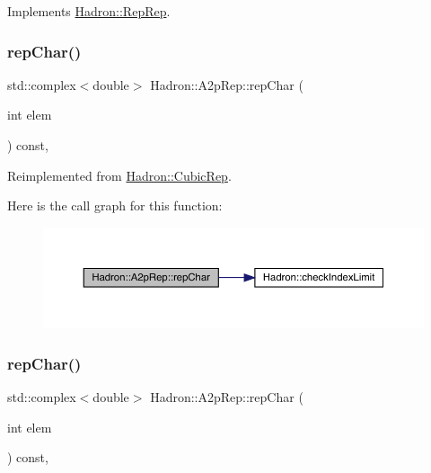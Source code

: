 Implements \mbox{\hyperlink{structHadron_1_1RepRep_ab3213025f6de249f7095892109575fde}{Hadron\+::\+Rep\+Rep}}.

\mbox{\label{structHadron_1_1A2pRep_a7e7d7668295318bf08c6ab79ce2208e6}} 
\subsubsection{\texorpdfstring{repChar()}{repChar()}\hspace{0.1cm}{\footnotesize\ttfamily [1/3]}}
{\footnotesize\ttfamily std\+::complex$<$double$>$ Hadron\+::\+A2p\+Rep\+::rep\+Char (\begin{DoxyParamCaption}\item[{int}]{elem }\end{DoxyParamCaption}) const\hspace{0.3cm}{\ttfamily [inline]}, {\ttfamily [virtual]}}



Reimplemented from \mbox{\hyperlink{structHadron_1_1CubicRep_af45227106e8e715e84b0af69cd3b36f8}{Hadron\+::\+Cubic\+Rep}}.

Here is the call graph for this function\+:
\nopagebreak
\begin{figure}[H]
\begin{center}
\leavevmode
\includegraphics[width=350pt]{d4/d33/structHadron_1_1A2pRep_a7e7d7668295318bf08c6ab79ce2208e6_cgraph}
\end{center}
\end{figure}
\mbox{\label{structHadron_1_1A2pRep_a7e7d7668295318bf08c6ab79ce2208e6}} 
\subsubsection{\texorpdfstring{repChar()}{repChar()}\hspace{0.1cm}{\footnotesize\ttfamily [2/3]}}
{\footnotesize\ttfamily std\+::complex$<$double$>$ Hadron\+::\+A2p\+Rep\+::rep\+Char (\begin{DoxyParamCaption}\item[{int}]{elem }\end{DoxyParamCaption}) const\hspace{0.3cm}{\ttfamily [inline]}, {\ttfamily [virtual]}}



